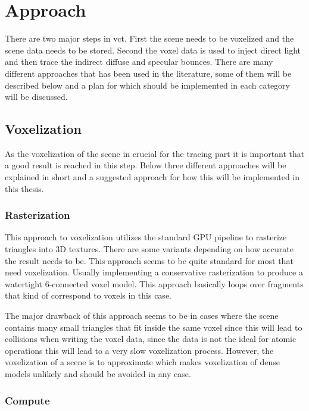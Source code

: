 \documentclass[a4paper, 12pt]{article}
\begin{document}
\section{Approach}
\label{sec:Approach}

There are two major steps in \gls{vct}. First the scene needs to be voxelized and the scene data needs to be stored. Second the voxel data is used to inject direct light and then trace the indirect diffuse and specular bounces. There are many different approaches that has been used in the literature, some of them will be described below and a plan for which should be implemented in each category will be discussed.

\subsection{Voxelization}

As the voxelization of the scene in crucial for the tracing part it is important that a good result is reached in this step. Below three different approaches will be explained in short and a suggested approach for how this will be implemented in this thesis. 

\subsubsection{Rasterization}

This approach to voxelization utilizes the standard GPU pipeline to rasterize triangles into 3D textures. There are some variants depending on how accurate the result needs to be. This approach seems to be quite standard for most that need voxelization. Usually implementing a conservative rasterization to produce a watertight 6-connected voxel model. This approach basically loops over fragments that kind of correspond to voxels in this case.

The major drawback of this approach seems to be in cases where the scene contains many small triangles that fit inside the same voxel since this will lead to collisions when writing the voxel data, since the data is not the ideal for atomic operations this will lead to a very slow voxelization process. However, the voxelization of a scene is to approximate which makes voxelization of dense models unlikely and should be avoided in any case. 

\subsubsection{Compute}
\end{document}
